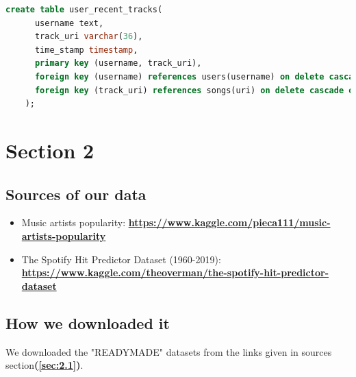 \documentclass[10pt]{article}
\begin{document}
\begin{lstlisting}[language=SQL,
        deletekeywords={IDENTITY,INT},
        morekeywords={clustered},    
        framesep=10pt,
        framextopmargin=10pt]
    create table user_recent_tracks(
      username text,
      track_uri varchar(36),
      time_stamp timestamp,
      primary key (username, track_uri),
      foreign key (username) references users(username) on delete cascade on update cascade,
      foreign key (track_uri) references songs(uri) on delete cascade on update cascade
    );
\end{lstlisting}

\section{Section 2}
\subsection{Sources of our data}
\label{sec:2.1}
\begin{itemize}
    \item Music artists popularity:  \href{https://www.kaggle.com/pieca111/music-artists-popularity}{\textbf{https://www.kaggle.com/pieca111/music-artists-popularity}} 
    \item The Spotify Hit Predictor Dataset (1960-2019): \href{https://www.kaggle.com/theoverman/the-spotify-hit-predictor-dataset}{\textbf{https://www.kaggle.com/theoverman/the-spotify-hit-predictor-dataset}}
\end{itemize}

\subsection{How we downloaded it}
We downloaded the "READYMADE" datasets from the links given in sources section\textbf{(\autoref{sec:2.1})}. 
\end{document}
